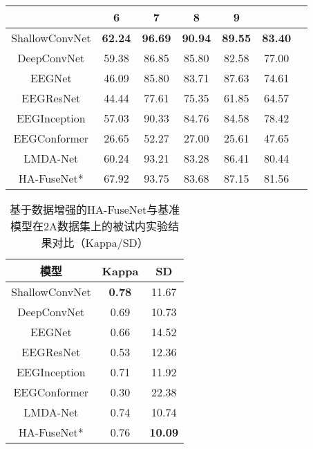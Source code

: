 \begin{table}[ht]
\begin{subtable}[ht]{\textwidth}
\begin{tabularx}{\textwidth}{CCCCCCC}
         & 6 & 7 & 8 & 9 &  \\
        \midrule
        ShallowConvNet\cite{schirrmeister2017deep}  & \textbf{62.24} & \textbf{96.69} & \textbf{90.94} & \textbf{89.55} & \textbf{83.40} \\
        DeepConvNet\cite{schirrmeister2017deep}  & 59.38 & 86.85 & 85.80 & 82.58 & 77.00 \\
        EEGNet\cite{lawhern2018eegnet} & 46.09 & 85.80 & 83.71 & 87.63 & 74.61 \\
        EEGResNet\cite{HBM:HBM23730}  & 44.44 & 77.61 & 75.35 & 61.85 & 64.57 \\
        EEGInception\cite{zhang2021eeg} & 57.03 & 90.33 & 84.76 & 84.58 & 78.42 \\
        EEGConformer\cite{song2022eeg}  & 26.65 & 52.27 & 27.00 & 25.61 & 47.65 \\
        LMDA-Net\cite{miao2023lmda}& 60.24 & 93.21 & 83.28 & 86.41 & 80.44 \\ 
        HA-FuseNet* & 67.92 & 93.75 & 83.68 & 87.15 & 81.56 \\
        \bottomrule
      \end{tabularx}
    \end{subtable}
\end{table}
\begin{table}[H]
    \centering
    \caption{基于数据增强的HA-FuseNet与基准模型在2A数据集上的被试内实验结果对比（Kappa/SD）}
    \label{tab:2acompareagsd}
    \begin{tabularx}{\textwidth}{CCC}
      \toprule
      模型 & Kappa & SD \\
      \midrule
      ShallowConvNet\cite{schirrmeister2017deep} & \textbf{0.78} & 11.67 \\
      DeepConvNet\cite{schirrmeister2017deep} & 0.69 & 10.73 \\
      EEGNet\cite{lawhern2018eegnet} & 0.66 & 14.52 \\
      EEGResNet\cite{HBM:HBM23730} & 0.53 & 12.36 \\
      EEGInception\cite{zhang2021eeg} & 0.71 & 11.92 \\
      EEGConformer\cite{song2022eeg} & 0.30 & 22.38 \\
      LMDA-Net\cite{miao2023lmda} & 0.74 & 10.74 \\
      HA-FuseNet* & 0.76 & \textbf{10.09} \\
      \bottomrule
    \end{tabularx}
\end{table}

